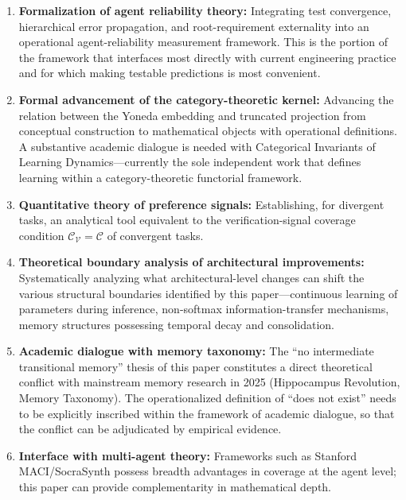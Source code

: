 \documentclass[11pt,a4paper]{article}
\theoremstyle{definition}
\newcommand{\verifspace}{\mathcal{C}_{\mathcal{V}}}
\newcommand{\taskcspace}{\mathcal{C}}
\begin{document}
\begin{enumerate}[leftmargin=*,itemsep=0.3em]
    \item \textbf{Formalization of agent reliability theory:} Integrating test convergence, hierarchical error propagation, and root-requirement externality into an operational agent-reliability measurement framework. This is the portion of the framework that interfaces most directly with current engineering practice and for which making testable predictions is most convenient.
    \item \textbf{Formal advancement of the category-theoretic kernel:} Advancing the relation between the Yoneda embedding and truncated projection from conceptual construction to mathematical objects with operational definitions. A substantive academic dialogue is needed with Categorical Invariants of Learning Dynamics\cite{categorical_invariants_2025}---currently the sole independent work that defines learning within a category-theoretic functorial framework.
    \item \textbf{Quantitative theory of preference signals:} Establishing, for divergent tasks, an analytical tool equivalent to the verification-signal coverage condition $\verifspace = \taskcspace$ of convergent tasks.
    \item \textbf{Theoretical boundary analysis of architectural improvements:} Systematically analyzing what architectural-level changes can shift the various structural boundaries identified by this paper---continuous learning of parameters during inference, non-softmax information-transfer mechanisms, memory structures possessing temporal decay and consolidation.
    \item \textbf{Academic dialogue with memory taxonomy:} The ``no intermediate transitional memory'' thesis of this paper constitutes a direct theoretical conflict with mainstream memory research in 2025 (Hippocampus Revolution, Memory Taxonomy\cite{memory_taxonomy_2025}). The operationalized definition of ``does not exist'' needs to be explicitly inscribed within the framework of academic dialogue, so that the conflict can be adjudicated by empirical evidence.
    \item \textbf{Interface with multi-agent theory:} Frameworks such as Stanford MACI/SocraSynth\cite{stanford_maci} possess breadth advantages in coverage at the agent level; this paper can provide complementarity in mathematical depth.
\end{enumerate}

\end{document}
